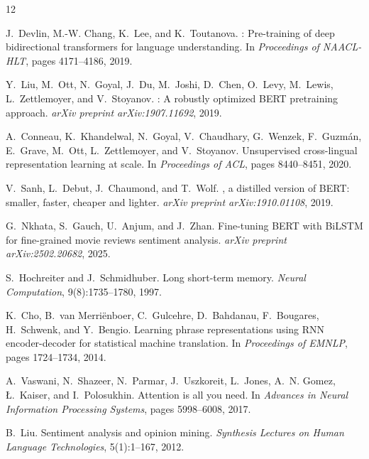 \documentclass[10pt,twocolumn,a4paper]{article}
\begin{document}
\begin{thebibliography}{12}

J.~Devlin, M.-W. Chang, K.~Lee, and K.~Toutanova.
: Pre-training of deep bidirectional transformers for language understanding.
\newblock In \emph{Proceedings of NAACL-HLT}, pages 4171--4186, 2019.

Y.~Liu, M.~Ott, N.~Goyal, J.~Du, M.~Joshi, D.~Chen, O.~Levy, M.~Lewis, L.~Zettlemoyer, and V.~Stoyanov.
: A robustly optimized {BERT} pretraining approach.
\newblock \emph{arXiv preprint arXiv:1907.11692}, 2019.

A.~Conneau, K.~Khandelwal, N.~Goyal, V.~Chaudhary, G.~Wenzek, F.~Guzm{\'a}n, E.~Grave, M.~Ott, L.~Zettlemoyer, and V.~Stoyanov.
\newblock Unsupervised cross-lingual representation learning at scale.
\newblock In \emph{Proceedings of ACL}, pages 8440--8451, 2020.

V.~Sanh, L.~Debut, J.~Chaumond, and T.~Wolf.
, a distilled version of {BERT}: smaller, faster, cheaper and lighter.
\newblock \emph{arXiv preprint arXiv:1910.01108}, 2019.

G.~Nkhata, S.~Gauch, U.~Anjum, and J.~Zhan.
\newblock Fine-tuning {BERT} with {BiLSTM} for fine-grained movie reviews sentiment analysis.
\newblock \emph{arXiv preprint arXiv:2502.20682}, 2025.

S.~Hochreiter and J.~Schmidhuber.
\newblock Long short-term memory.
\newblock \emph{Neural Computation}, 9(8):1735--1780, 1997.

K.~Cho, B.~van Merri{\"e}nboer, C.~Gulcehre, D.~Bahdanau, F.~Bougares, H.~Schwenk, and Y.~Bengio.
\newblock Learning phrase representations using {RNN} encoder-decoder for statistical machine translation.
\newblock In \emph{Proceedings of EMNLP}, pages 1724--1734, 2014.

A.~Vaswani, N.~Shazeer, N.~Parmar, J.~Uszkoreit, L.~Jones, A.~N. Gomez, {\L}.~Kaiser, and I.~Polosukhin.
\newblock Attention is all you need.
\newblock In \emph{Advances in Neural Information Processing Systems}, pages 5998--6008, 2017.

B.~Liu.
\newblock Sentiment analysis and opinion mining.
\newblock \emph{Synthesis Lectures on Human Language Technologies}, 5(1):1--167, 2012.


\end{thebibliography}
\end{document}
